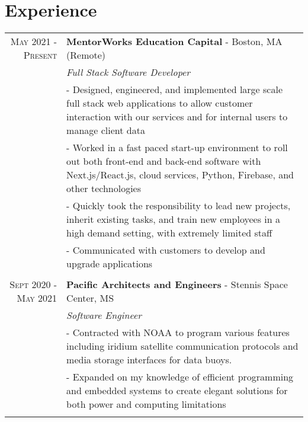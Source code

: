 \documentclass[letterpaper,10pt]{article}
\begin{document}
\section{\textcolor{HeaderColor}{Experience}}
\begin{tabular}{r|p{14cm}}
\textsc{May 2021 - Present} & {\bf MentorWorks Education Capital} - Boston, MA (Remote)
\\&\emph{\textcolor{HeaderColor}{Full Stack Software Developer}}
\\& \small{ - Designed, engineered, and implemented large scale full stack web applications to allow customer interaction with our services and for internal users to manage client data}
\vspace{.1cm}
\\& \small{ - Worked in a fast paced start-up environment to roll out both front-end and back-end software with Next.js/React.js, cloud services, Python, Firebase, and other technologies }
\vspace{.1cm}
\\& \small{ - Quickly took the responsibility to lead new projects, inherit existing tasks, and train new employees in a high demand setting, with extremely limited staff }
\vspace{.1cm}
\\& \small{ - Communicated with customers to develop and upgrade applications}
\\\multicolumn{2}{c}{} \\

 \textsc{Sept 2020 - May 2021} & {\bf Pacific Architects and Engineers} - Stennis Space Center, MS
 \\&\emph{\textcolor{HeaderColor}{Software Engineer}}\\
 &\small{ - Contracted with NOAA to program various features including iridium satellite communication protocols and media storage interfaces for data buoys.} 
 \vspace{.1cm}
 \\& \small{ - Expanded on my knowledge of efficient programming and embedded systems to create elegant solutions for both power and computing limitations
 }\\\multicolumn{2}{c}{} \\


\end{tabular}
\end{document}
